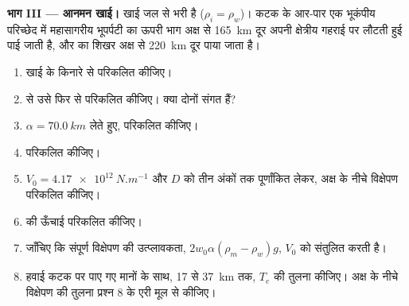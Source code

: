 \begin{problem}
\noindent\textbf{भाग III --- आनमन खाई।} खाई जल से भरी है
($\rho_i = \rho_w$)। कटक के आर-पार एक भूकंपीय परिच्छेद में महासागरीय भूपर्पटी का ऊपरी भाग
अक्ष से \qty{165}{km} दूर अपनी क्षेत्रीय गहराई पर लौटती हुई पाई जाती है, और
 का शिखर अक्ष से \qty{220}{km} दूर पाया जाता है।
\begin{enumerate}[resume]
  \item खाई के किनारे से  परिकलित कीजिए।
  \item {} से उसे फिर से परिकलित कीजिए। क्या दोनों संगत हैं?
  \item $\alpha = \qty{70.0}{km}$ लेते हुए,  परिकलित कीजिए।
  \item {} परिकलित कीजिए।
  \item $V_0 = \qty{4.17e12}{N.m^{-1}}$ और $D$ को तीन अंकों तक पूर्णांकित लेकर,
        अक्ष के नीचे विक्षेपण परिकलित कीजिए।
  \item {} की ऊँचाई परिकलित कीजिए।
  \item जाँचिए कि संपूर्ण विक्षेपण की उत्प्लावकता, $2w_0\alpha(\rho_m -
        \rho_w)g$, $V_0$ को संतुलित करती है।
  \item हवाई कटक पर पाए गए मानों के साथ, 17 से
        \qty{37}{km} तक, $T_e$ की तुलना कीजिए। अक्ष के नीचे विक्षेपण की
        तुलना प्रश्न 8 के एरी मूल से कीजिए।
\end{enumerate}


\end{problem}
